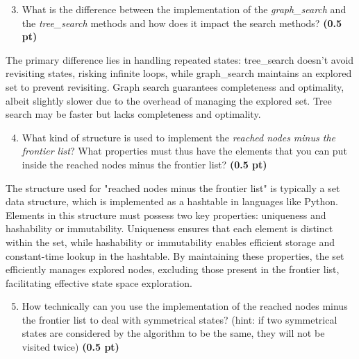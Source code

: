 \documentclass[11pt,a4paper]{../template/report}
\begin{document}
\begin{enumerate}
\setcounter{enumi}{2}
    \item What is the difference between the implementation of the \textit{graph\_search} and the \textit{tree\_search} methods and how does it impact the search methods? \textbf{(0.5 pt)}
\end{enumerate}

\begin{answer}
The primary difference lies in handling repeated states: tree\_search doesn't avoid revisiting states, risking infinite loops, while graph\_search maintains an explored set to prevent revisiting. Graph search guarantees completeness and optimality, albeit slightly slower due to the overhead of managing the explored set. Tree search may be faster but lacks completeness and optimality.
\end{answer}



\begin{enumerate}
\setcounter{enumi}{3}
    \item What kind of structure is used to implement the \textit{reached nodes minus the frontier list}? What properties must thus have the elements that you can
	put inside the reached nodes minus the frontier list? \textbf{(0.5 pt)}
\end{enumerate}

\begin{answer}
The structure used for "reached nodes minus the frontier list" is typically a set data structure, which is implemented as a hashtable in languages like Python. Elements in this structure must possess two key properties: uniqueness and hashability or immutability. Uniqueness ensures that each element is distinct within the set, while hashability or immutability enables efficient storage and constant-time lookup in the hashtable. By maintaining these properties, the set efficiently manages explored nodes, excluding those present in the frontier list, facilitating effective state space exploration.
\end{answer}



\begin{enumerate}
\setcounter{enumi}{4}
    \item How technically can you use the implementation of the reached nodes minus the frontier list to deal with symmetrical states? (hint: if two symmetrical states are considered by the algorithm to be the same, they will not be visited twice) \textbf{(0.5 pt)}
\end{enumerate}
\end{document}
